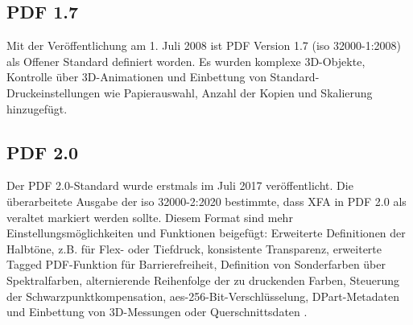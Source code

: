 \subsection{PDF 1.7}
Mit der Veröffentlichung am 1. Juli 2008 ist PDF Version 1.7 (\gls{iso} 32000-1:2008) als Offener Standard definiert worden. Es wurden komplexe 3D-Objekte, Kontrolle über 3D-Animationen und Einbettung von Standard-Druckeinstellungen wie Papierauswahl, Anzahl der Kopien und Skalierung hinzugefügt\cite{proj-consult}.

\subsection{PDF 2.0}
Der PDF 2.0-Standard wurde erstmals im Juli 2017 veröffentlicht. Die überarbeitete Ausgabe der \gls{iso} 32000-2:2020 bestimmte, dass XFA in PDF 2.0 als veraltet markiert werden sollte. Diesem Format sind mehr Einstellungsmöglichkeiten und Funktionen beigefügt: Erweiterte Definitionen der Halbtöne, z.B. für Flex- oder Tiefdruck, konsistente Transparenz, erweiterte Tagged PDF-Funktion für Barrierefreiheit, Definition von Sonderfarben über Spektralfarben, alternierende Reihenfolge der zu druckenden Farben, Steuerung der Schwarzpunktkompensation, \gls{aes}-256-Bit-Verschlüsselung, DPart-Metadaten und Einbettung von 3D-Messungen oder Querschnittsdaten \cite{proj-consult}.
